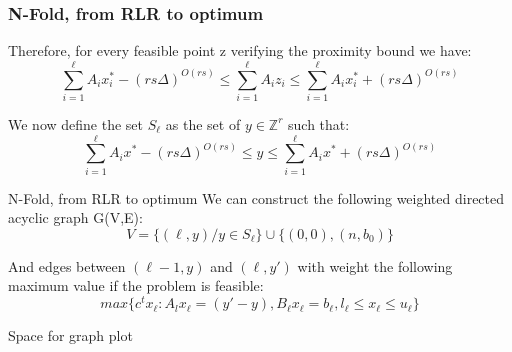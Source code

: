 \documentclass{beamer}
\begin{document}
    \begin{frame}
        \frametitle{N-Fold, from RLR to optimum}
        Therefore, for every feasible point z verifying the proximity bound we have:
        \begin{equation*}
            \sum_{i=1}^\ell A_ix_i^* - (rs\Delta)^{O(rs)} \leq \sum_{i=1}^\ell A_iz_i \leq \sum_{i=1}^\ell A_ix_i^* + (rs\Delta)^{O(rs)} 
        \end{equation*}
        
        We now define the set $S_\ell$ as the set of $y \in \mathbb{Z}^r$ such that:
        \begin{equation*}
        \sum_{i=1}^\ell A_ix^* - (rs\Delta)^{O(rs)} \leq y \leq \sum_{i=1}^\ell A_ix^* + (rs\Delta)^{O(rs)} 
        \end{equation*}
        
        
        
        
        
    \end{frame}
    \begin{frame}{N-Fold, from RLR to optimum}
        We can construct the following weighted directed acyclic graph G(V,E):
        \begin{equation*}
            V = \{(\ell,y) / y \in S_\ell\} \cup \{ (0,0), (n,b_0) \}
        \end{equation*}
        
        And edges between $(\ell-1,y)$ and $(\ell,y')$ with weight the following maximum value if the problem is feasible:
        \begin{equation*}
            max\{c^tx_\ell: A_lx_\ell = (y'-y), B_\ell x_\ell = b_\ell, l_\ell \leq x_\ell \leq u_\ell \}
        \end{equation*}
        
        \begin{block}{Space for graph plot}
            \vspace{2cm}
        \end{block}
    \end{frame}
\end{document}
